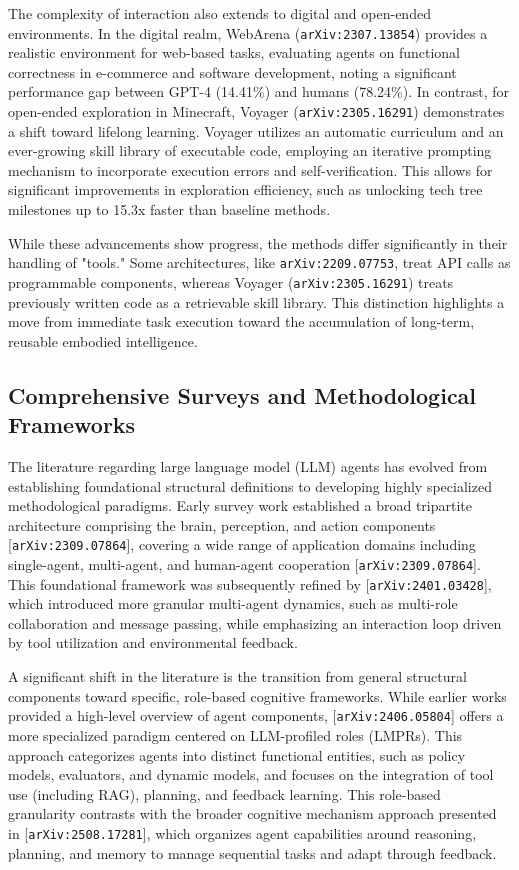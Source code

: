 \documentclass[11pt]{article}
\begin{document}
The complexity of interaction also extends to digital and open-ended environments. In the digital realm, WebArena (\texttt{arXiv:2307.13854}) provides a realistic environment for web-based tasks, evaluating agents on functional correctness in e-commerce and software development, noting a significant performance gap between GPT-4 (14.41\%) and humans (78.24\%). In contrast, for open-ended exploration in Minecraft, Voyager (\texttt{arXiv:2305.16291}) demonstrates a shift toward lifelong learning. Voyager utilizes an automatic curriculum and an ever-growing skill library of executable code, employing an iterative prompting mechanism to incorporate execution errors and self-verification. This allows for significant improvements in exploration efficiency, such as unlocking tech tree milestones up to 15.3x faster than baseline methods.

While these advancements show progress, the methods differ significantly in their handling of "tools." Some architectures, like \texttt{arXiv:2209.07753}, treat API calls as programmable components, whereas Voyager (\texttt{arXiv:2305.16291}) treats previously written code as a retrievable skill library. This distinction highlights a move from immediate task execution toward the accumulation of long-term, reusable embodied intelligence.

\subsection{Comprehensive Surveys and Methodological Frameworks}

The literature regarding large language model (LLM) agents has evolved from establishing foundational structural definitions to developing highly specialized methodological paradigms. Early survey work established a broad tripartite architecture comprising the brain, perception, and action components [\texttt{arXiv:2309.07864}], covering a wide range of application domains including single-agent, multi-agent, and human-agent cooperation [\texttt{arXiv:2309.07864}]. This foundational framework was subsequently refined by [\texttt{arXiv:2401.03428}], which introduced more granular multi-agent dynamics, such as multi-role collaboration and message passing, while emphasizing an interaction loop driven by tool utilization and environmental feedback.

A significant shift in the literature is the transition from general structural components toward specific, role-based cognitive frameworks. While earlier works provided a high-level overview of agent components, [\texttt{arXiv:2406.05804}] offers a more specialized paradigm centered on LLM-profiled roles (LMPRs). This approach categorizes agents into distinct functional entities, such as policy models, evaluators, and dynamic models, and focuses on the integration of tool use (including RAG), planning, and feedback learning. This role-based granularity contrasts with the broader cognitive mechanism approach presented in [\texttt{arXiv:2508.17281}], which organizes agent capabilities around reasoning, planning, and memory to manage sequential tasks and adapt through feedback.
\end{document}
